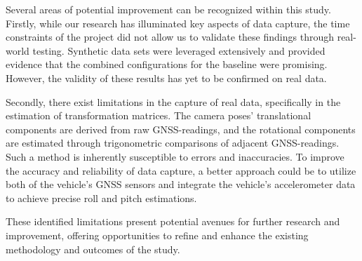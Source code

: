 Several areas of potential improvement can be recognized within this study. Firstly, while our research has illuminated key aspects of data capture, the time constraints of the project did not allow us to validate these findings through real-world testing. Synthetic data sets were leveraged extensively and provided evidence that the combined configurations for the baseline were promising. However, the validity of these results has yet to be confirmed on real data.

Secondly, there exist limitations in the capture of real data, specifically in the estimation of transformation matrices. The camera poses' translational components are derived from raw GNSS-readings, and the rotational components are estimated through trigonometric comparisons of adjacent GNSS-readings. Such a method is inherently susceptible to errors and inaccuracies. To improve the accuracy and reliability of data capture, a better approach could be to utilize both of the vehicle's GNSS sensors and integrate the vehicle's accelerometer data to achieve precise roll and pitch estimations.

These identified limitations present potential avenues for further research and improvement, offering opportunities to refine and enhance the existing methodology and outcomes of the study.